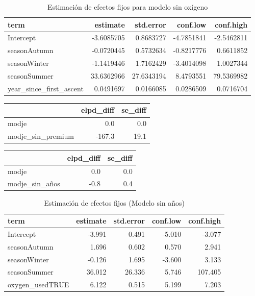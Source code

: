 \documentclass[
  letterpaper,
  DIV=11,
  numbers=noendperiod]{scrartcl}
\begin{document}
\begin{longtable}[t]{lrrrr}
\caption{\label{tab:unnamed-chunk-27}Estimación de efectos fijos para modelo sin oxígeno}\\
\toprule
term & estimate & std.error & conf.low & conf.high\\
\midrule
Intercept & -3.6085705 & 0.8683727 & -4.7851841 & -2.5462811\\
seasonAutumn & -0.0720445 & 0.5732634 & -0.8217776 & 0.6611852\\
seasonWinter & -1.1419446 & 1.7162429 & -3.4014098 & 1.0027344\\
seasonSummer & 33.6362966 & 27.6343194 & 8.4793551 & 79.5369982\\
year\_since\_first\_ascent & 0.0491697 & 0.0166085 & 0.0286509 & 0.0716704\\
\bottomrule
\end{longtable}

\begin{longtable}[]{@{}lrr@{}}
\toprule\noalign{}
& elpd\_diff & se\_diff \\
\midrule\noalign{}
\endhead
\bottomrule\noalign{}
\endlastfoot
modje & 0.0 & 0.0 \\
modje\_sin\_premium & -167.3 & 19.1 \\
\end{longtable}

\begin{longtable}[]{@{}lrr@{}}
\toprule\noalign{}
& elpd\_diff & se\_diff \\
\midrule\noalign{}
\endhead
\bottomrule\noalign{}
\endlastfoot
modje & 0.0 & 0.0 \\
modje\_sin\_años & -0.8 & 0.4 \\
\end{longtable}

\begin{longtable}[t]{lrrrr}
\caption{\label{tab:unnamed-chunk-30}Estimación de efectos fijos (Modelo sin años)}\\
\toprule
term & estimate & std.error & conf.low & conf.high\\
\midrule
Intercept & -3.991 & 0.491 & -5.010 & -3.077\\
seasonAutumn & 1.696 & 0.602 & 0.570 & 2.941\\
seasonWinter & -0.126 & 1.695 & -3.600 & 3.133\\
seasonSummer & 36.012 & 26.336 & 5.746 & 107.405\\
oxygen\_usedTRUE & 6.122 & 0.515 & 5.199 & 7.203\\
\bottomrule
\end{longtable}
\end{document}
